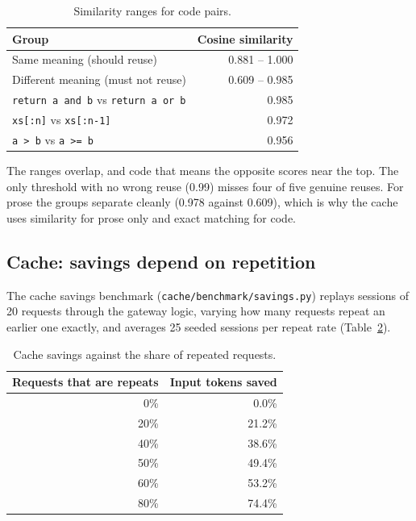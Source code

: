 \documentclass[12pt, a4paper, oneside]{report}
\newcommand{\code}[1]{\texttt{#1}}
\begin{document}
\begin{table}[H]
\centering
\begin{tabular}{lr}
\toprule
Group & Cosine similarity \\
\midrule
Same meaning (should reuse)          & 0.881 -- 1.000 \\
Different meaning (must not reuse)   & 0.609 -- 0.985 \\
\midrule
\code{return a and b} vs \code{return a or b} & 0.985 \\
\code{xs[:n]} vs \code{xs[:n-1]}               & 0.972 \\
\code{a > b} vs \code{a >= b}                  & 0.956 \\
\bottomrule
\end{tabular}
\caption{Similarity ranges for code pairs.}
\label{tab:threshold}
\end{table}

The ranges overlap, and code that means the opposite scores near the top. The
only threshold with no wrong reuse (0.99) misses four of five genuine reuses. For
prose the groups separate cleanly (0.978 against 0.609), which is why the cache
uses similarity for prose only and exact matching for code.

\subsection{Cache: savings depend on repetition}

The cache savings benchmark (\code{cache/benchmark/savings.py}) replays sessions
of 20 requests through the gateway logic, varying how many requests repeat an
earlier one exactly, and averages 25 seeded sessions per repeat rate
(Table~\ref{tab:repeat}).

\begin{table}[H]
\centering
\begin{tabular}{rr}
\toprule
Requests that are repeats & Input tokens saved \\
\midrule
0\%  & 0.0\% \\
20\% & 21.2\% \\
40\% & 38.6\% \\
50\% & 49.4\% \\
60\% & 53.2\% \\
80\% & 74.4\% \\
\bottomrule
\end{tabular}
\caption{Cache savings against the share of repeated requests.}
\label{tab:repeat}
\end{table}
\end{document}
